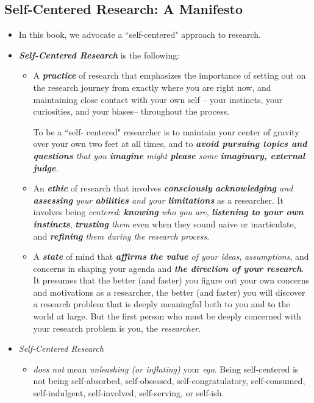 \documentclass[11pt]{article}
\begin{document}
\subsection{Self-Centered Research: A Manifesto}
\begin{itemize}
\item In this book, we advocate a ``self-centered" approach to research. 

\item \emph{\textbf{Self-Centered Research}} is the following:
\begin{itemize}
\item A \emph{\textbf{practice}} of research that emphasizes the importance of setting out on the research journey from exactly where you are right now, and maintaining close contact with your own self -- your instincts, your curiosities, and your biases-- throughout the process.

To be a ``self- centered" researcher is to maintain your center of gravity over your own two feet at all times, and to \emph{\textbf{avoid pursuing topics and questions} that you \textbf{imagine} might \textbf{please} some \textbf{imaginary, external judge}}.

\item An \emph{\textbf{ethic}} of research that involves \emph{\textbf{consciously} \textbf{acknowledging} and \textbf{assessing} your \textbf{abilities} and your \textbf{limitations}} as a researcher. It involves being \emph{centered}: \emph{\textbf{knowing} who you are}, \emph{\textbf{listening to your own instincts}}, \emph{\textbf{trusting} them} even when they sound naive or inarticulate, and \emph{\textbf{refining} them during the research process}.

\item A \emph{\textbf{state}} of mind that \emph{\textbf{affirms the value} of your ideas}, \emph{assumptions}, and concerns in shaping your agenda and \emph{\textbf{the direction of your research}}. It presumes that the better (and faster) you figure out your own concerns and motivations as a researcher, the better (and faster) you will discover a research problem that is deeply meaningful both to you and to the world at large. But the first person who must be deeply concerned with your research problem is you, the \emph{researcher}.
\end{itemize}

\item \emph{Self-Centered Research} 
\begin{itemize}
\item \emph{does not} mean \emph{unleashing (or inflating)} your \emph{ego}. Being self-centered is not being self-absorbed, self-obsessed, self-congratulatory, self-consumed, self-indulgent, self-involved, self-serving, or self-ish.


\end{itemize}
\end{itemize}
\end{document}
